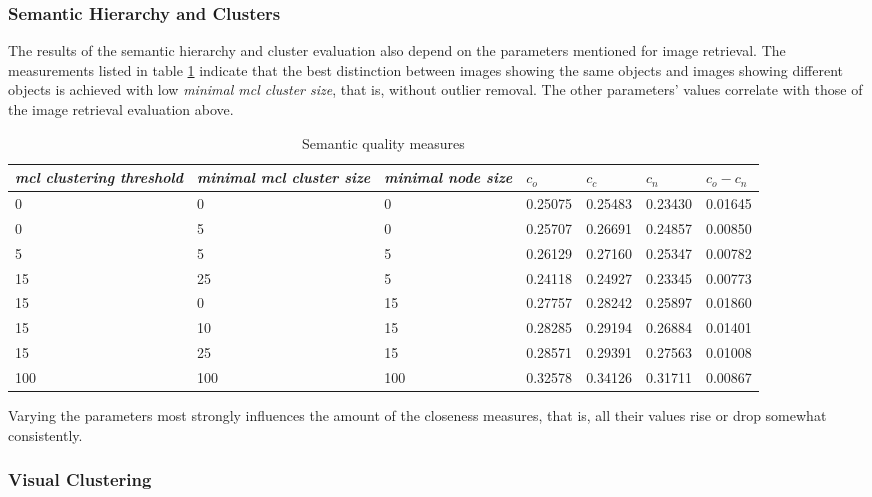 \subsubsection{Semantic Hierarchy and Clusters}

The results of the semantic hierarchy and cluster evaluation also depend on the parameters mentioned for image retrieval. The measurements listed in table \ref{tab_treeevaluation} indicate that the best distinction between images showing the same objects and images showing different objects is achieved with low \emph{minimal mcl cluster size}, that is, without outlier removal. The other parameters' values correlate with those of the image retrieval evaluation above.\\

\begin{table}[h]
    \begin{tabular}{| p{2.2cm} | p{2.2cm} | p{2cm} || p{1.4cm} | p{1.4cm} | p{1.4cm} | p{1.4cm} |}
	\hline
    \emph{mcl clustering threshold} & \emph{minimal mcl cluster size}		& \emph{minimal node size} & $c_o $ & $c_c$ & $c_n$ & $c_o-c_n$ \\ \hline
    0 	& 0 	& 0 & 0.25075 & 0.25483 & 0.23430 & 0.01645 \\ \hline
    0 	& 5 	& 0 & 0.25707 & 0.26691 & 0.24857 & 0.00850 \\ \hline
    5 	& 5 	& 5 & 0.26129 & 0.27160 & 0.25347 & 0.00782 \\ \hline
    15 	& 25 &  5 & 0.24118 & 0.24927 & 0.23345 & 0.00773\\ \hline
    15 	& 0 & 15 & 0.27757 & 0.28242 & 0.25897 & 0.01860 \\ \hline
    15 	& 10 & 15 & 0.28285 & 0.29194 & 0.26884 & 0.01401 \\ \hline
    15 	& 25 & 15 & 0.28571 & 0.29391 & 0.27563 & 0.01008 \\ \hline
    	100 	& 100 & 100 & 0.32578 & 0.34126 & 0.31711 & 0.00867 \\ \hline
    \end{tabular}
    \caption{Semantic quality measures}
	\label{tab_treeevaluation}
\end{table}

Varying the parameters most strongly influences the amount of the closeness measures, that is, all their values rise or drop somewhat consistently.


\subsubsection{Visual Clustering}

